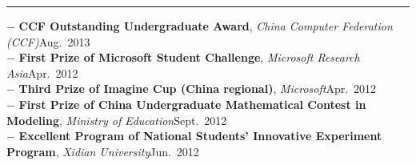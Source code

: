\documentclass[a4paper,10pt]{article}
\newenvironment{rSection}[1]{ %
  \medskip
  \hspace{-1.5em}{\color{Blue}\MakeUppercase{\large \bf {#1}}} %
  \vspace{-0.2em}
  \medskip
  \hrule %
  \begin{list}{}{ %
    \setlength{\leftmargin}{1.5em} %
  }
\setlength{\itemsep}{1pt}
  \item[]
}{
  \end{list}
}
\newcommand{\detail}[1]{{$-$ {#1}}}
\newcommand{\honor}[3]{\detail{{\bf #1}, {\em {#3}}\hfill {#2}}}
\begin{document}
\vspace{-0.5em}

\begin{rSection}{Honors}
  \vspace{-1.5em}
  \item
    \honor{CCF Outstanding Undergraduate Award}{Aug.~2013}{China Computer Federation (CCF)}\\
    \honor{First Prize of Microsoft Student Challenge}{Apr.~2012}{Microsoft Research Asia}\\
    \honor{Third Prize of Imagine Cup (China regional)}{Apr.~2012}{Microsoft}\\
    \honor{First Prize of China Undergraduate Mathematical Contest in Modeling}{Sept.~2012}{Ministry of Education}\\
    \honor{Excellent Program of National Students' Innovative Experiment Program}{Jun.~2012}{Xidian University}
\end{rSection}






\end{document}
